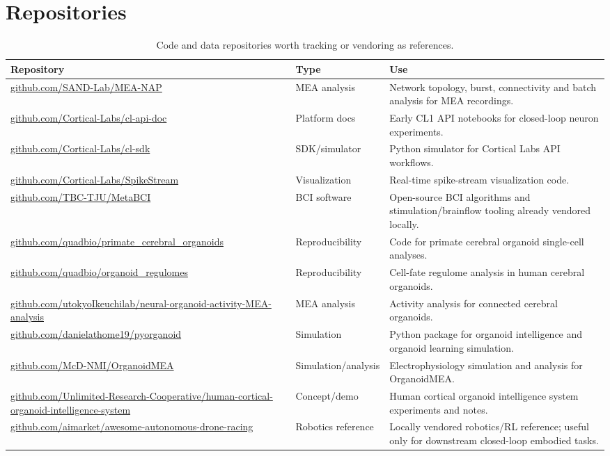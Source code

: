 \documentclass[10pt,twocolumn]{article}
\begin{document}
\section{Repositories}

\begin{table}[t]
\small
\caption{Code and data repositories worth tracking or vendoring as references.}
\begin{tabularx}{\textwidth}{p{}p{}X}
\toprule
\textbf{Repository} & \textbf{Type} & \textbf{Use} \\
\midrule
\url{github.com/SAND-Lab/MEA-NAP} & MEA analysis & Network topology, burst, connectivity and batch analysis for MEA recordings. \\
\url{github.com/Cortical-Labs/cl-api-doc} & Platform docs & Early CL1 API notebooks for closed-loop neuron experiments. \\
\url{github.com/Cortical-Labs/cl-sdk} & SDK/simulator & Python simulator for Cortical Labs API workflows. \\
\url{github.com/Cortical-Labs/SpikeStream} & Visualization & Real-time spike-stream visualization code. \\
\url{github.com/TBC-TJU/MetaBCI} & BCI software & Open-source BCI algorithms and stimulation/brainflow tooling already vendored locally. \\
\url{github.com/quadbio/primate_cerebral_organoids} & Reproducibility & Code for primate cerebral organoid single-cell analyses. \\
\url{github.com/quadbio/organoid_regulomes} & Reproducibility & Cell-fate regulome analysis in human cerebral organoids. \\
\url{github.com/utokyoIkeuchilab/neural-organoid-activity-MEA-analysis} & MEA analysis & Activity analysis for connected cerebral organoids. \\
\url{github.com/danielathome19/pyorganoid} & Simulation & Python package for organoid intelligence and organoid learning simulation. \\
\url{github.com/McD-NMI/OrganoidMEA} & Simulation/analysis & Electrophysiology simulation and analysis for OrganoidMEA. \\
\url{github.com/Unlimited-Research-Cooperative/human-cortical-organoid-intelligence-system} & Concept/demo & Human cortical organoid intelligence system experiments and notes. \\
\url{github.com/aimarket/awesome-autonomous-drone-racing} & Robotics reference & Locally vendored robotics/RL reference; useful only for downstream closed-loop embodied tasks. \\
\bottomrule
\end{tabularx}
\end{table}
\end{document}
